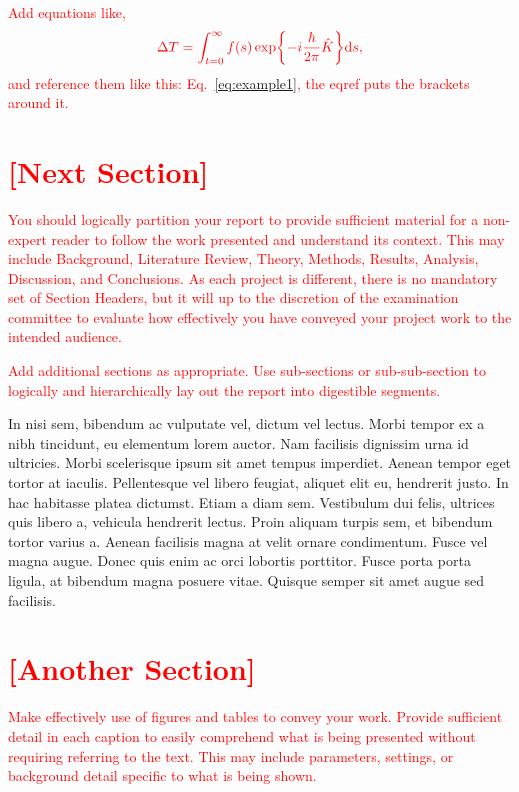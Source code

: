 \documentclass[aps,pra,a4paper,nofootinbib,onecolumn,tightenlines,longbibliography,12pt,amsfonts,amssymb,amsmath,floatfix]{revtex4-2} %
\begin{document}
\textcolor{red}{Add equations like,}
\begin{equation} \color{red}
\Delta T = \int_{t=0}^\infty f(s) \exp{-i \frac{\hbar}{2\pi}\hat{K}} \mathrm{d}s,
\label{eq:example1} %
\end{equation}
\textcolor{red}{and reference them like this: Eq.~\eqref{eq:example1}, the eqref puts the brackets around it.}

\newpage
\section{\textcolor{red}{[Next Section]}}

\textcolor{red}{You should logically partition your report to provide sufficient material for a non-expert reader to follow the work presented and understand its context. This may include Background, Literature Review, Theory, Methods, Results, Analysis, Discussion, and Conclusions. As each project is different, there is no mandatory set of Section Headers, but it will up to the discretion of the examination committee to evaluate how effectively you have conveyed your project work to the intended audience.}

\textcolor{red}{Add additional sections as appropriate. Use sub-sections or sub-sub-section to logically and hierarchically lay out the report into digestible segments.}

\blindtext

In nisi sem, bibendum ac vulputate vel, dictum vel lectus. Morbi tempor ex a nibh tincidunt, eu elementum lorem auctor. Nam facilisis dignissim urna id ultricies. Morbi scelerisque ipsum sit amet tempus imperdiet. Aenean tempor eget tortor at iaculis. Pellentesque vel libero feugiat, aliquet elit eu, hendrerit justo. In hac habitasse platea dictumst. Etiam a diam sem. Vestibulum dui felis, ultrices quis libero a, vehicula hendrerit lectus. Proin aliquam turpis sem, et bibendum tortor varius a. Aenean facilisis magna at velit ornare condimentum. Fusce vel magna augue. Donec quis enim ac orci lobortis porttitor. Fusce porta porta ligula, at bibendum magna posuere vitae. Quisque semper sit amet augue sed facilisis.

\newpage
\section{\textcolor{red}{[Another Section]}}

\textcolor{red}{Make effectively use of figures and tables to convey your work. Provide sufficient detail in each caption to easily comprehend what is being presented without requiring referring to the text. This may include parameters, settings,  or background detail specific to what is being shown.}
\end{document}
